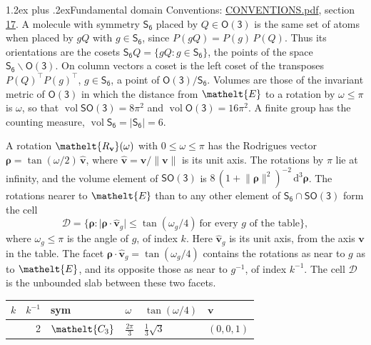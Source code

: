 \documentclass[10pt,a4paper]{article}
\makeatletter
\renewcommand\section{\@startsection{section}{1}{\z@}{-3ex plus -1ex minus -.2ex}%
  {1.2ex plus .2ex}{\normalfont\large\sffamily\bfseries\color{parttitle}}}
\numberwithin{equation}{section}
\newcommand{\eltfont}[1]{{\let\sigma\eltsigma\mathelt{#1}}}
\newcommand{\grp}[1]{\mathsf{#1}}
\newcommand{\cls}[1]{\eltfont{#1}}
\newcommand{\elt}[1]{\eltfont{#1}}
\newcommand{\dirvec}[3]{(#1, #2, #3)}
\newcommand{\unitaxis}{\hat{\mathbf{v}}}
\newcommand{\vv}{\mathbf{v}}
\newcommand{\diff}{\mathrm{d}}
\newcommand{\vol}{\operatorname{vol}}
\newcommand{\rodrigues}{\boldsymbol{\rho}}
\newcommand{\fcell}{\mathcal{D}}
\makeatother
\begin{document}
\section{Fundamental domain}\label{s:fundamental_domain}
Conventions: \href{../../CONVENTIONS.pdf}{CONVENTIONS.pdf}, section \href{../../CONVENTIONS.pdf\#conv.17}{17}.
\leavevmode\label{n:element.placement}A molecule with symmetry $\grp{S_{6}}$ placed by $Q \in \grp{O(3)}$ is the same set of atoms when placed by $gQ$ with $g \in \grp{S_{6}}$, since $P(gQ) = P(g)\,P(Q)$. \label{n:operator.cosets}Thus its orientations are the cosets $\grp{S_{6}}Q = \{gQ : g \in \grp{S_{6}}\}$, the points of the space $\grp{S_{6}}\backslash\grp{O(3)}$. On column vectors a coset is the left coset of the transposes $P(Q)^{\top}P(g)^{\top}$, $g \in \grp{S_{6}}$, a point of $\grp{O(3)}/\grp{S_{6}}$.
\leavevmode\label{n:operator.volume}Volumes are those of the invariant metric of \href{O3.pdf}{$\grp{O(3)}$} in which the distance from $\elt{E}$ to a rotation by $\omega \le \pi$ is $\omega$, so that $\vol\grp{SO(3)} = 8\pi^2$ and $\vol\grp{O(3)} = 16\pi^2$. A finite group has the counting measure, $\vol\grp{S_{6}} = |\grp{S_{6}}| = 6$.

\leavevmode\label{n:vector.rodrigues}\label{n:vector.unitaxis}A rotation $\elt{R_{\vv}}(\omega)$ with $0 \le \omega \le \pi$ has the Rodrigues vector $\rodrigues = \tan(\omega/2)\,\unitaxis$, where $\unitaxis = \vv/\lVert\vv\rVert$ is its unit axis. The rotations by $\pi$ lie at infinity, and the volume element of \href{SO3.pdf}{$\grp{SO(3)}$} is $8\,(1 + \lVert\rodrigues\rVert^2)^{-2}\,\diff^3\rodrigues$.
\leavevmode\label{n:set.cell}The rotations nearer to $\elt{E}$ than to any other element of $\grp{S_{6}} \cap \grp{SO(3)}$ form the cell
\begin{equation}\label{e:cell}\fcell = \bigl\{\rodrigues : \lvert\rodrigues\cdot\unitaxis_g\rvert \le \tan(\omega_g/4)\ \text{for every $g$ of the table}\bigr\},\end{equation}
where $\omega_g \le \pi$ is the angle of $g$, of index $k$. Here $\unitaxis_g$ is its unit axis, from the axis $\vv$ in the table. The facet $\rodrigues\cdot\unitaxis_g = \tan(\omega_g/4)$ contains the rotations as near to $g$ as to $\elt{E}$, and its opposite those as near to $g^{-1}$, of index $k^{-1}$. The cell $\fcell$ is the unbounded slab between these two facets.
{\small{\renewcommand{\arraystretch}{1.3}\begin{longtable}{@{}rrllll@{}}\toprule
$k$ & $k^{-1}$ & sym & $\omega$ & $\tan(\omega/4)$ & $\vv$\\\midrule\endhead
\bottomrule\endfoot\endlastfoot
1 & 2 & $\cls{C_{3}}$ & $\tfrac{2\pi}{3}$ & $\tfrac{1}{3}\sqrt{3}$ & $\dirvec{0}{0}{1}$\\
\bottomrule\end{longtable}}}
\end{document}
